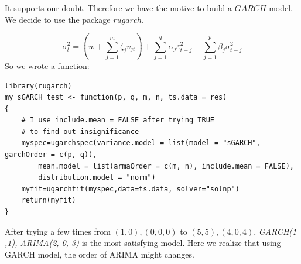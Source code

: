 \documentclass[a4paper, 11pt]{article}
\begin{document}
\indent It supports our doubt. Therefore we have the motive to build a $GARCH$ model. We decide to use the package $rugarch$.\par
\begin{equation*}
	\sigma_t^2 = (w + \sum_{j = 1}^m \zeta_j v_{jt}) + \sum_{j = 1}^q \alpha_j \varepsilon_{t-j}^2 + \sum_{j = 1}^p \beta_j \sigma_{t-j}^2
\end{equation*} 
\indent So we wrote a function:
\begin{verbatim}
library(rugarch)
my_sGARCH_test <- function(p, q, m, n, ts.data = res)
{
	# I use include.mean = FALSE after trying TRUE
	# to find out insignificance
    myspec=ugarchspec(variance.model = list(model = "sGARCH", garchOrder = c(p, q)), 
    	mean.model = list(armaOrder = c(m, n), include.mean = FALSE), 
    	distribution.model = "norm")
    myfit=ugarchfit(myspec,data=ts.data, solver="solnp")
    return(myfit)  
}
\end{verbatim}
\indent After trying a few times from $(1, 0), (0, 0, 0)$ to $(5, 5), (4, 0, 4)$, \textit{GARCH(1 ,1), ARIMA(2, 0, 3)} is the most satisfying model. Here we realize that using GARCH model, the order of ARIMA might changes.
\end{document}
